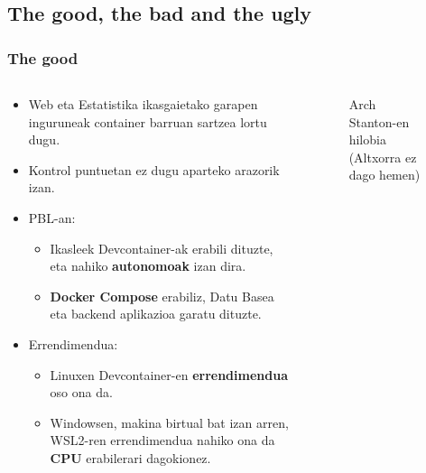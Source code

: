 \documentclass[lang=eu,biz=foe,aspectratio=169,handout]{mupresentation}
\begin{document}
\subsection{The good, the bad and the ugly}

\begin{frame}
  \frametitle{The good}
  \begin{columns}
    \begin{column}{0.7\linewidth}
      \begin{itemize}
        \item Web eta Estatistika ikasgaietako garapen inguruneak container barruan sartzea lortu dugu.
        \item Kontrol puntuetan ez dugu aparteko arazorik izan.
        \item PBL-an:
          \begin{itemize}
            \item Ikasleek Devcontainer-ak erabili dituzte, eta nahiko \textbf{autonomoak} izan dira.
            \item \textbf{Docker Compose} erabiliz, Datu Basea eta backend aplikazioa garatu dituzte.
          \end{itemize}
        \item Errendimendua:
          \begin{itemize}
            \item Linuxen Devcontainer-en \textbf{errendimendua} oso ona da.
            \item Windowsen, makina birtual bat izan arren, WSL2-ren errendimendua nahiko ona da \textbf{CPU} erabilerari dagokionez.
          \end{itemize}
      \end{itemize}
    \end{column}
    \begin{column}{0.25\linewidth}
      \begin{figure}
        \caption{Arch Stanton-en hilobia (Altxorra ez dago hemen)}
      \end{figure}
    \end{column}
  \end{columns}
\end{frame}
\end{document}
